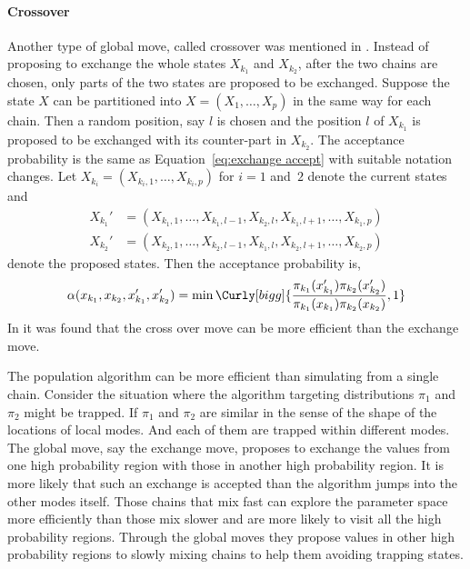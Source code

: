 \paragraph{Crossover}

Another type of global move, called crossover was mentioned in
\cite{Liang:2001dc}. Instead of proposing to exchange the whole states
$X_{k_1}$ and $X_{k_2}$, after the two chains are chosen, only parts of the
two states are proposed to be exchanged. Suppose the state $X$ can be
partitioned into $X = (X_1,\dots,X_p)$ in the same way for each chain. Then a
random position, say $l$ is chosen and the position $l$ of $X_{k_1}$ is
proposed to be exchanged with its counter-part in $X_{k_2}$. The acceptance
probability is the same as Equation~\eqref{eq:exchange accept} with suitable
notation changes. Let $X_{k_i} = (X_{k_i,1},\dots,X_{k_i,p})$ for $i = 1$
and~$2$ denote the current states and
\begin{align*}
  X_{k_1}' &= (X_{k_1,1},\dots,X_{k_1,l-1},
  X_{k_2,l},X_{k_1,l+1},\dots,X_{k_1,p}) \\
  X_{k_2}' &= (X_{k_2,1},\dots,X_{k_2,l-1},
  X_{k_1,l},X_{k_2,l+1},\dots,X_{k_2,p})
\end{align*}
denote the proposed states. Then the acceptance probability is,
\begin{equation}
  \alpha(x_{k_1},x_{k_2},x_{k_1}',x_{k_2}') = \min\Curly[bigg]
  {\frac{\pi_{k_1}(x_{k_1}')\pi_{k_2}(x_{k_2}')}
  {\pi_{k_1}(x_{k_1})\pi_{k_2}(x_{k_2})},1}
  \label{eq:cross accept}
\end{equation}
In \cite{Jasra:2007in} it was found that the cross over move can be more
efficient than the exchange move.

The population \mcmc algorithm can be more efficient than simulating from a
single chain. Consider the situation where the \mcmc algorithm targeting
distributions $\pi_1$ and $\pi_2$ might be trapped. If $\pi_1$ and $\pi_2$
are similar in the sense of the shape of the locations of local modes. And
each of them are trapped within different modes. The global move, say the
exchange move, proposes to exchange the values from one high probability
region with those in another high probability region. It is more likely that
such an exchange is accepted than the \mcmc algorithm jumps into the other
modes itself. Those chains that mix fast can explore the parameter space more
efficiently than those mix slower and are more likely to visit all the high
probability regions. Through the global moves they propose values in other
high probability regions to slowly mixing chains to help them avoiding
trapping states.


